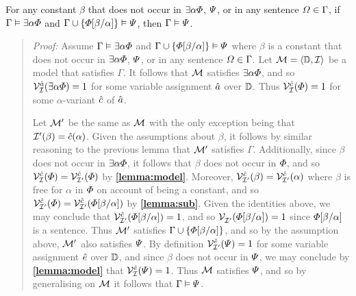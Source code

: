 \begin{Lthm} \label{lemma:exiinst}
  For any constant $\beta$ that does not occur in $\exists\alpha\varPhi$, $\varPsi$, or in any sentence $\varOmega\in\Gamma$, if $\Gamma \vDash \exists\alpha\varPhi$ and $\Gamma \cup \lbrace\varPhi[\beta/\alpha]\rbrace \vDash \varPsi$, then $\Gamma \vDash \varPsi$.
\end{Lthm}

\begin{quote} 
  \textit{Proof:} Assume $\Gamma \vDash \exists\alpha\varPhi$ and $\Gamma \cup \lbrace\varPhi[\beta/\alpha]\rbrace \vDash \varPsi$ where $\beta$ is a constant that does not occur in $\exists\alpha\varPhi$, $\varPsi$, or in any sentence $\varOmega\in\Gamma$. 
  Let $\mathcal{M}=\langle\mathbb{D},\mathcal{I}\rangle$ be a model that satisfies $\Gamma$.
  It follows that $\mathcal{M}$ satisfies $\exists \alpha\varPhi$, and so $\mathcal{V}_{\mathcal{I}}^{\hat{a}}(\exists \alpha\varPhi)=1$ for some variable assignment $\hat{a}$ over $\mathbb{D}$.
  Thus $\mathcal{V}_{\mathcal{I}}^{\hat{c}}(\varPhi)=1$ for some $\alpha$-variant $\hat{c}$ of $\hat{a}$.

  Let $\mathcal{M}'$ be the same as $\mathcal{M}$ with the only exception being that $\mathcal{I}'(\beta)=\hat{c}(\alpha)$.
  Given the assumptions about $\beta$, it follows by similar reasoning to the previous lemma that $\mathcal{M}'$ satisfies $\Gamma$.
  Additionally, since $\beta$ does not occur in $\exists \alpha\varPhi$, it follows that $\beta$ does not occur in $\varPhi$, and so $\mathcal{V}_{\mathcal{I}}^{\hat{c}}(\varPhi)=\mathcal{V}_{\mathcal{I}'}^{\hat{c}}(\varPhi)$ by \textbf{\ref{lemma:model}}.
  Moreover, $\mathcal{V}_{\mathcal{I}'}^{\hat{c}}(\beta)=\mathcal{V}_{\mathcal{I}'}^{\hat{c}}(\alpha)$ where $\beta$ is free for $\alpha$ in $\varPhi$ on account of being a constant, and so $\mathcal{V}_{\mathcal{I}'}^{\hat{c}}(\varPhi)=\mathcal{V}_{\mathcal{I}'}^{\hat{c}}(\varPhi[\beta/\alpha])$ by \textbf{\ref{lemma:sub}}. 
  Given the identities above, we may conclude that $\mathcal{V}_{\mathcal{I}'}^{\hat{c}}(\varPhi[\beta/\alpha])=1$, and so $\mathcal{V}_{\mathcal{I}'}^{}(\varPhi[\beta/\alpha])=1$ since $\varPhi[\beta/\alpha]$ is a sentence.
  Thus $\mathcal{M}'$ satisfies $\Gamma \cup \lbrace\varPhi[\beta/\alpha]\rbrace$, and so by the assumption above, $\mathcal{M}'$ also satisfies $\varPsi$.
  By definition $\mathcal{V}_{\mathcal{I}'}^{\hat{e}}(\varPsi)=1$ for some variable assignment $\hat{e}$ over $\mathbb{D}$, and since $\beta$ does not occur in $\varPsi$, we may conclude by \textbf{\ref{lemma:model}} that $\mathcal{V}_{\mathcal{I}}^{\hat{e}}(\varPsi)=1$.
  Thus $\mathcal{M}$ satisfies $\varPsi$, and so by generalising on $\mathcal{M}$ it follows that $\Gamma \vDash \varPsi$.
\end{quote}






